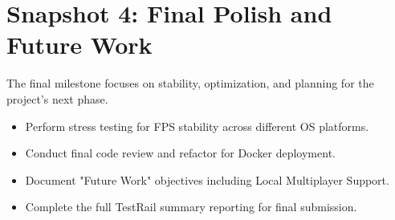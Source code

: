\documentclass{article}
\begin{document}
\section{Snapshot 4: Final Polish and Future Work}
The final milestone focuses on stability, optimization, and planning for the project's next phase.
\begin{itemize}
    \item Perform stress testing for FPS stability across different OS platforms.
    \item Conduct final code review and refactor for Docker deployment.
    \item Document "Future Work" objectives including Local Multiplayer Support.
    \item Complete the full TestRail summary reporting for final submission.
\end{itemize}
\end{document}
